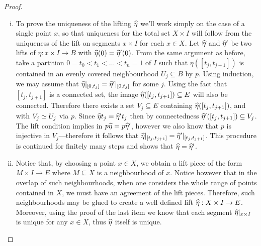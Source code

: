 \begin{proof}
\begin{enumerate}[(i)]
\item To prove the uniqueness of the lifting \(\widehat\eta\) we'll work simply on
  the case of a single point \(x\), so that uniqueness for the total set
  \(X \times I\) will follow from the uniqueness of the lift on segments
  \(x \times I\) for each \(x \in X\). Let \(\widehat\eta\) and \(\widehat\eta'\) be
  two lifts of \(\eta: x \times I \to B\) with \(\widehat\eta(0) =
  \widehat\eta'(0)\). From the same argument as before, take a partition
  \(0 = t_0 < t_1 < \dots < t_n = 1\) of \(I\) such that
  \(\eta([t_j, t_{j+1}])\) is contained in an evenly covered neighbourhood
  \(U_j \subseteq B\) by \(p\). Using induction, we may assume that
  \(\widehat\eta|_{[0, t_j]} = \widehat\eta'|_{[0, t_j]}\) for some \(j\). Using the
  fact that \([t_j, t_{j+1}]\) is a connected set, the image
  \(\widehat\eta([t_j, t_{j+1}]) \subseteq E\) will also be connected. Therefore
  there exists a set \(V_j \subseteq E\) containing
  \(\widehat\eta([t_j, t_{j+1}])\), and with \(V_j \simeq U_j\) via \(p\). Since
  \(\widehat\eta t_j = \widehat\eta' t_j\) then by connectedness
  \(\widehat\eta'([t_j, t_{j+1}]) \subseteq V_j\). The lift condition implies in
  \(p \widehat\eta = p \widehat\eta'\), however we also know that \(p\) is injective
  in \(V_j\)---therefore it follows that
  \(\widehat\eta|_{[t_j, t_{j+1}]} = \widehat\eta'|_{[t_j, t_{j+1}]}\). This procedure
  is continued for finitely many steps and shows that
  \(\widehat\eta = \widehat\eta'\).

\item Notice that, by choosing a point \(x \in X\), we obtain a lift piece of
  the form \(M \times I \to E\) where \(M \subseteq X\) is a neighbourhood of
  \(x\). Notice however that in the overlap of such neighbourhoods, when one
  considers the whole range of points contained in \(X\), we must have an
  agreement of the lift pieces. Therefore, such neighbourhoods may be glued to
  create a well defined lift \(\widehat\eta: X \times I \to E\). Moreover, using
  the proof of the last item we know that each segment
  \(\widehat\eta|_{x \times I}\) is unique for any \(x \in X\), thus \(\widehat\eta\)
  itself is unique.
\end{enumerate}
\end{proof}

